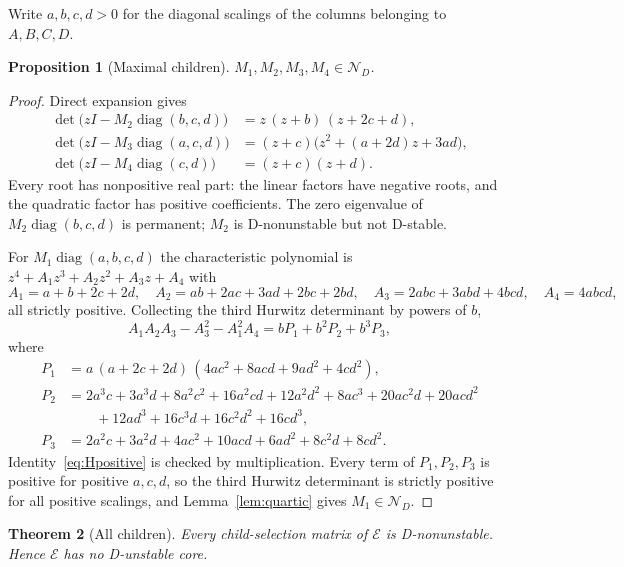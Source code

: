\documentclass[11pt,a4paper]{article}
\theoremstyle{plain}
\newtheorem{theorem}{Theorem}[section]
\newtheorem{proposition}[theorem]{Proposition}
\theoremstyle{definition}
\theoremstyle{remark}
\newcommand{\diag}{\operatorname{diag}}
\newcommand{\DN}{\mathcal{N}_D}
\begin{document}
Write $a,b,c,d>0$ for the diagonal scalings of the columns belonging to $A,B,C,D$.

\begin{proposition}[Maximal children]\label{prop:maximal}
$M_1,M_2,M_3,M_4\in\DN$.
\end{proposition}

\begin{proof}
Direct expansion gives
\begin{align*}
\det\bigl(zI-M_2\diag(b,c,d)\bigr)&=z\,(z+b)\,(z+2c+d),\\
\det\bigl(zI-M_3\diag(a,c,d)\bigr)&=(z+c)\bigl(z^2+(a+2d)z+3ad\bigr),\\
\det\bigl(zI-M_4\diag(c,d)\bigr)&=(z+c)(z+d).
\end{align*}
Every root has nonpositive real part: the linear factors have negative roots, and the quadratic factor has positive coefficients. The zero eigenvalue of $M_2\diag(b,c,d)$ is permanent; $M_2$ is D-nonunstable but not D-stable.

For $M_1\diag(a,b,c,d)$ the characteristic polynomial is $z^4+A_1z^3+A_2z^2+A_3z+A_4$ with
\begin{equation}\label{eq:fullcoeff}
A_1=a+b+2c+2d,\quad
A_2=ab+2ac+3ad+2bc+2bd,\quad
A_3=2abc+3abd+4bcd,\quad
A_4=4abcd,
\end{equation}
all strictly positive. Collecting the third Hurwitz determinant by powers of $b$,
\begin{equation}\label{eq:Hpositive}
A_1A_2A_3-A_3^2-A_1^2A_4=bP_1+b^2P_2+b^3P_3,
\end{equation}
where
\begin{align*}
P_1&=a\,(a+2c+2d)\,(4ac^2+8acd+9ad^2+4cd^2),\\
P_2&=2a^3c+3a^3d+8a^2c^2+16a^2cd+12a^2d^2+8ac^3+20ac^2d+20acd^2\\
&\qquad+12ad^3+16c^3d+16c^2d^2+16cd^3,\\
P_3&=2a^2c+3a^2d+4ac^2+10acd+6ad^2+8c^2d+8cd^2 .
\end{align*}
Identity~\eqref{eq:Hpositive} is checked by multiplication. Every term of $P_1,P_2,P_3$ is positive for positive $a,c,d$, so the third Hurwitz determinant is strictly positive for all positive scalings, and Lemma~\ref{lem:quartic} gives $M_1\in\DN$.
\end{proof}

\begin{theorem}[All children]\label{thm:children}
Every child-selection matrix of $\mathcal E$ is D-nonunstable. Hence $\mathcal E$ has no D-unstable core.
\end{theorem}
\end{document}
